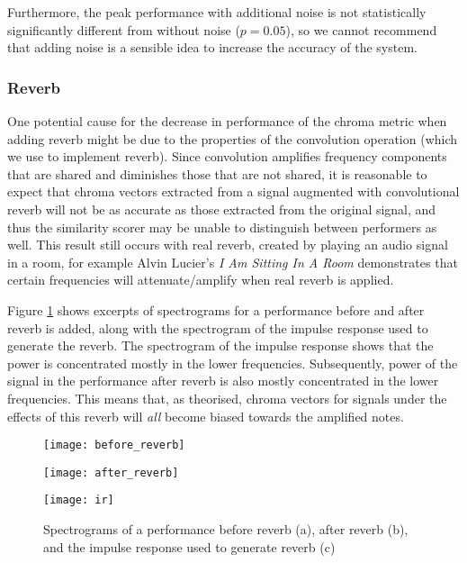 \documentclass[oneside, class=book, 12pt, crop=false]{standalone}
\begin{document}
Furthermore, the peak performance with additional noise is not statistically significantly different from without noise ($p=0.05$), so we cannot recommend that adding noise is a sensible idea to increase the accuracy of the system.

\subsubsection{Reverb}

One potential cause for the decrease in performance of the chroma metric when adding reverb might be due to the properties of the convolution operation (which we use to implement reverb). Since convolution amplifies frequency components that are shared and diminishes those that are not shared, it is reasonable to expect that chroma vectors extracted from a signal augmented with convolutional reverb will not be as accurate as those extracted from the original signal, and thus the similarity scorer may be unable to distinguish between performers as well. This result still occurs with real reverb, created by playing an audio signal in a room, for example Alvin Lucier's \textit{I Am Sitting In A Room}\cite{alvinlucier}  demonstrates that certain frequencies will attenuate/amplify when real reverb is applied.

Figure \ref{fig:convolution spectrograms} shows excerpts of spectrograms for a performance before and after reverb is added, along with the spectrogram of the impulse response used to generate the reverb. The spectrogram of the impulse response shows that the power is concentrated mostly in the lower frequencies. Subsequently, power of the signal in the performance after reverb is also mostly concentrated in the lower frequencies. This means that, as theorised, chroma vectors for signals under the effects of this reverb will \textit{all} become biased towards the amplified notes.




\begin{figure}[h]\label{fig:convolution spectrograms}
  \captionsetup{justification=centering}
\begin{minipage}{.33\textwidth}
  \texttt{[image: before\_reverb]}
  \subcaption{}
\end{minipage}%
\begin{minipage}{.33\textwidth}
  \flushleft
  \texttt{[image: after\_reverb]}
  \subcaption{}
\end{minipage}%
\begin{minipage}{.33\textwidth}
  \centering
  \texttt{[image: ir]}
  \subcaption{}
\end{minipage}
\caption{Spectrograms of a performance before reverb (a), after reverb (b), and the impulse response used to generate reverb (c)}
\end{figure}
\end{document}
